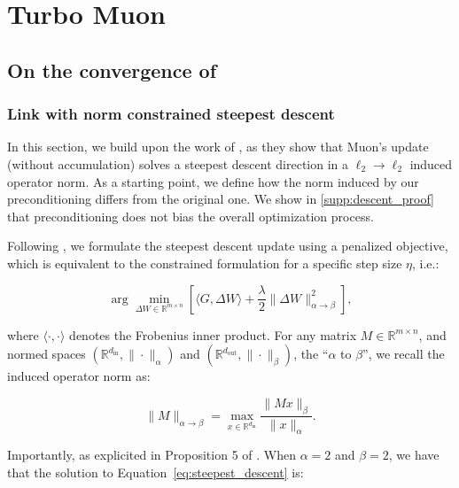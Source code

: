 \chapter{Turbo Muon}

\section{On the convergence of \turbomuon}
\subsection{Link with norm  constrained steepest descent}
\label{ap:proof_convergence}
    In this section, we build upon the work of \cite{bernstein2024oldoptimizernewnorm}, as they show that Muon's update (without accumulation) solves a steepest descent direction in a $\ell_2 \rightarrow \ell_2$ induced operator norm.
    As a starting point, we define how the norm induced by our preconditioning differs from the original one. We show in \cref{supp:descent_proof}
    that preconditioning does not bias the overall optimization process.
    
    \hfill
    
    Following \cite{bernstein2024oldoptimizernewnorm}, we formulate the steepest descent update using a penalized objective, which is equivalent to the constrained formulation for a specific step size $\eta$, i.e.:
    
    \begin{equation}
        \arg \min_{\Delta W \in \mathbb{R}^{m \times n}} \left[ \langle G, \Delta W \rangle + \frac{\lambda}{2} \| \Delta W\|_{\alpha \rightarrow \beta}^2 \right],
    \label{eq:steepest_descent}
    \end{equation}
    
    \noindent where $\langle \cdot , \cdot \rangle$ denotes the Frobenius inner product. For any matrix $M \in \mathbb{R}^{m \times n}$, and normed spaces $(\mathbb{R}^{d_\mathrm{in}}, \| \cdot \|_\alpha)$ and $(\mathbb{R}^{d_\mathrm{out}}, \| \cdot \|_\beta)$, the ``$\alpha$ to $\beta$'', we recall the induced operator norm as:
    
    \begin{equation}
        \| M \|_{\alpha \rightarrow \beta} = \max_{x \in \mathbb{R}^{d_\mathrm{in}}} \frac{\| M x \|_\beta}{\| x \|_\alpha}.
    \end{equation}
    
    \noindent Importantly, as explicited in Proposition 5 of \cite{bernstein2024oldoptimizernewnorm}. When $\alpha = 2$ and $\beta = 2$, we have that the solution to Equation~\ref{eq:steepest_descent} is:
    
